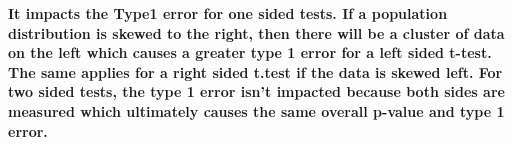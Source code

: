\documentclass{article}\usepackage[]{graphicx}\usepackage[]{xcolor}
\begin{document}
\begin{enumerate}
\begin{enumerate}
    \textbf{It impacts the Type1 error for one sided tests. If a population distribution is skewed to the right, then there will be a cluster of data on the left which causes a greater type 1 error for a left sided t-test. The same applies for a right sided t.test if the data is skewed left. For two sided tests, the type 1 error isn't impacted because both sides are measured which ultimately causes the same overall p-value and type 1 error. }
  \end{enumerate}
\end{enumerate}

\end{document}
